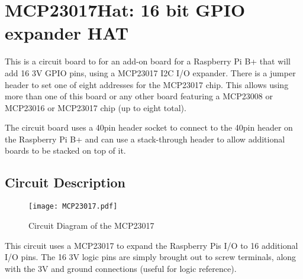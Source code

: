 %
%
%
%
% 
%
%
%
%
%
% 
%

\chapter{MCP23017Hat: 16 bit GPIO expander HAT}

This is a circuit board to for an add-on board for a Raspberry Pi B+ that will 
add 16 3V GPIO pins, using a MCP23017 I2C I/O expander. There is a jumper 
header to set one of eight addresses for the MCP23017 chip.  This allows using 
more than one of this board or any other board featuring a MCP23008 or 
MCP23016 or MCP23017 chip (up to eight total). 

The circuit board uses a 40pin header socket to connect to the 40pin header on 
the  Raspberry Pi B+ and can use a  stack-through  header to allow  additional 
boards to be stacked on top of it.                                             
 
\section{Circuit Description}          

\begin{figure}[hbpt]\begin{centering}%
\texttt{[image: MCP23017.pdf]}
\caption{Circuit Diagram of the MCP23017}
\end{centering}\end{figure}
This circuit uses a MCP23017 to expand the Raspberry Pis I/O to 16 additional 
I/O pins. The 16 3V logic pins are simply brought out to screw terminals, 
along with the 3V and ground connections (useful for logic reference).

